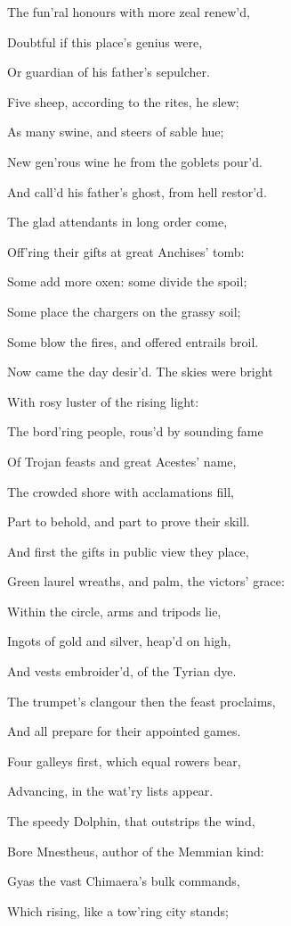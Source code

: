 The fun’ral honours with more zeal renew’d,

Doubtful if this place’s genius were,

Or guardian of his father’s sepulcher.

Five sheep, according to the rites, he slew;

As many swine, and steers of sable hue;

New gen’rous wine he from the goblets pour’d.

And call’d his father’s ghost, from hell restor’d.

The glad attendants in long order come,

Off’ring their gifts at great Anchises’ tomb:

Some add more oxen: some divide the spoil;

Some place the chargers on the grassy soil;

Some blow the fires, and offered entrails broil.

Now came the day desir’d. The skies were bright

With rosy luster of the rising light:

The bord’ring people, rous’d by sounding fame

Of Trojan feasts and great Acestes’ name,

The crowded shore with acclamations fill,

Part to behold, and part to prove their skill.

And first the gifts in public view they place,

Green laurel wreaths, and palm, the victors’ grace:

Within the circle, arms and tripods lie,

Ingots of gold and silver, heap’d on high,

And vests embroider’d, of the Tyrian dye.

The trumpet’s clangour then the feast proclaims,

And all prepare for their appointed games.

Four galleys first, which equal rowers bear,

Advancing, in the wat’ry lists appear.

The speedy Dolphin, that outstrips the wind,

Bore Mnestheus, author of the Memmian kind:

Gyas the vast Chimaera’s bulk commands,

Which rising, like a tow’ring city stands;


